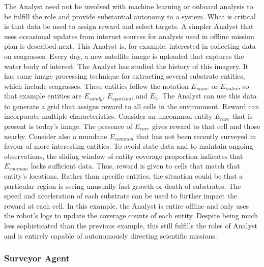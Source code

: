 \documentclass{tamuccthesis}
\begin{document}
The Analyst need not be involved with machine learning or onboard analysis to be fulfill the role and provide substantial autonomy to a system. What is critical is that data be used to assign reward and select targets. A simpler Analyst that uses occasional updates from internet sources for analysis used in offline mission plan is described next. This Analyst is, for example, interested in collecting data on seagrasses. Every day, a new satellite image is uploaded that captures the water body of interest. The Analyst has studied the history of this imagery. It has some image processing technique for extracting several substrate entities, which include seagrasses. These entities follow the notation $E_{name}$ or $E_{index}$, so that example entities are $E_{sandy}$, $E_{spartina}$, and $E_{5}$. The Analyst can use this data to generate a grid that assigns reward to all cells in the environment. Reward can incorporate multiple characteristics. Consider an uncommon entity $E_{rare}$ that is present is today's image. The presence of $E_{rare}$ gives reward to that cell and those nearby. Consider also a mundane $E_{common}$ that has not been recently surveyed in favour of more interesting entities. To avoid state data and to maintain ongoing observations, the sliding window of entity coverage proportion indicates that $E_{common}$ lacks sufficient data. Thus, reward is given to cells that match that entity's locations. Rather than specific entities, the situation could be that a particular region is seeing unusually fast growth or death of substrates. The speed and acceleration of each substrate can be used to further impact the reward at each cell. In this example, the Analyst is entire offline and only uses the robot's logs to update the coverage counts of each entity. Despite being much less sophisticated than the previous example, this still fulfills the roles of Analyst and is entirely capable of autonomously directing scientific missions. 


\subsubsection{Surveyor Agent}
\end{document}
